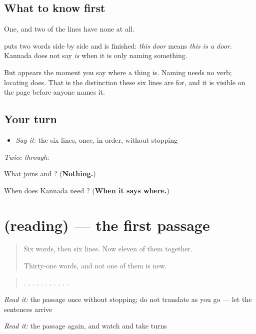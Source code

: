 \subsection*{What to know first}
One, and two of the lines have none at all.

\textbf{ } puts two words side by side and is finished: \emph{this door} means \emph{this is a door}. Kannada does not say \emph{is} when it is only naming something.

But \textbf{} appears the moment you say where a thing is. Naming needs no verb; locating does. That is the distinction these six lines are for, and it is visible on the page before anyone names it.

\subsection*{Your turn}
\begin{itemize}
\raggedright
  \item \emph{Say it:} the six lines, once, in order, without stopping
\end{itemize}

\emph{Twice through:}

\begin{tcolorbox}[breakable,colback=teal!4,colframe=teal!35!black,title={Before you move on}]
What joins \textbf{} and \textbf{}? (\textbf{Nothing.})

When does Kannada need \textbf{}? (\textbf{When it says where.})
\end{tcolorbox}
\section[(reading)]{(reading) — the first passage}

\label{lesson:KA-C76-modala-oduvike}



\begin{quote}
Six words, then six lines. Now eleven of them together.

Thirty-one words, and not one of them is new.
\end{quote}

\begin{tcolorbox}[breakable,skin=enhanced,colback=orange!6,colframe=orange!45!black,boxrule=0.5pt,arc=1mm,left=6pt,right=6pt,top=4pt,bottom=4pt,fonttitle=\bfseries,title={Read this}]
\begin{quote}
 .  .   .     .   .  .   .   .   .   .  .
\end{quote}

\emph{Read it:} the passage once without stopping; do not translate as you go — let the sentences arrive

\emph{Read it:} the passage again, and watch \textbf{} and \textbf{} take turns
\end{tcolorbox}

